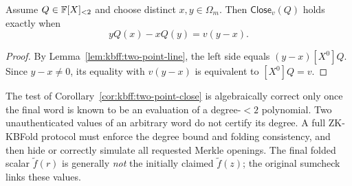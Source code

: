 \begin{corollary}\label{cor:kbff:two-point-close}
Assume $Q\in\mathbb{F}[X]_{<2}$ and choose distinct $x,y\in\Omega_m$.
Then $\mathsf{Close}_{v}(Q)$ holds exactly when
\[
 yQ(x)-xQ(y)=v(y-x).
\]
\end{corollary}
\begin{proof}
By Lemma~\ref{lem:kbff:two-point-line}, the left side equals
$(y-x)[X^0]Q$. Since $y-x\neq0$, its equality with $v(y-x)$ is
equivalent to $[X^0]Q=v$.
\end{proof}

\begin{remark}
The test of Corollary~\ref{cor:kbff:two-point-close} is algebraically
correct only once the final word is known to be an evaluation of a
degree-$<2$ polynomial. Two unauthenticated values of an arbitrary word
do not certify its degree. A full ZK-KBFold protocol must enforce
the degree bound and folding consistency, and then hide or correctly
simulate all requested Merkle openings. The final folded scalar
$\widetilde f(r)$ is generally \emph{not} the initially claimed
$\widetilde f(z)$; the original sumcheck links these values.
\end{remark}
